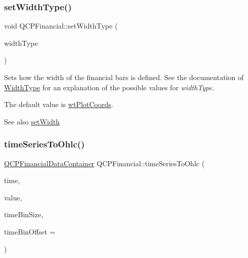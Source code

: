 \subsubsection{\texorpdfstring{setWidthType()}{setWidthType()}}
{\footnotesize\ttfamily void Q\+C\+P\+Financial\+::set\+Width\+Type (\begin{DoxyParamCaption}\item[{\mbox{\hyperlink{class_q_c_p_financial_aef1761dda71a53dc5269685e9e492626}{Q\+C\+P\+Financial\+::\+Width\+Type}}}]{width\+Type }\end{DoxyParamCaption})}

Sets how the width of the financial bars is defined. See the documentation of \mbox{\hyperlink{class_q_c_p_financial_aef1761dda71a53dc5269685e9e492626}{Width\+Type}} for an explanation of the possible values for {\itshape width\+Type}.

The default value is \mbox{\hyperlink{class_q_c_p_financial_aef1761dda71a53dc5269685e9e492626af676bc8dbe700b96b333329c9dbfc30f}{wt\+Plot\+Coords}}.

\begin{DoxySeeAlso}{See also}
\mbox{\hyperlink{class_q_c_p_financial_a99633f8bac86a61d534ae5eeb1a3068f}{set\+Width}} 
\end{DoxySeeAlso}
\mbox{\label{class_q_c_p_financial_a9a058c035040d3939b8884f4aaccb1a7}} 
\subsubsection{\texorpdfstring{timeSeriesToOhlc()}{timeSeriesToOhlc()}}
{\footnotesize\ttfamily \mbox{\hyperlink{qcustomplot_8h_ae36e482e04f19a54782f01ab38c354a6}{Q\+C\+P\+Financial\+Data\+Container}} Q\+C\+P\+Financial\+::time\+Series\+To\+Ohlc (\begin{DoxyParamCaption}\item[{const Q\+Vector$<$ double $>$ \&}]{time,  }\item[{const Q\+Vector$<$ double $>$ \&}]{value,  }\item[{double}]{time\+Bin\+Size,  }\item[{double}]{time\+Bin\+Offset = {} }\end{DoxyParamCaption})\hspace{0.3cm}{\ttfamily [static]}}

